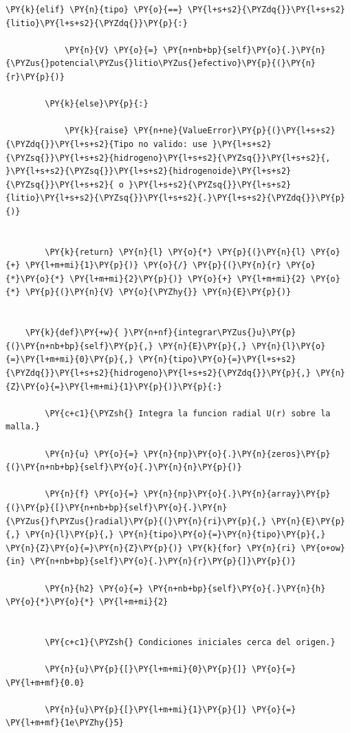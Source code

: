 \documentclass[11pt]{article}
\makeatletter
\def\PY@reset{\let\PY@it=\relax \let\PY@bf=\relax \let\PY@ul=\relax \let\PY@tc=\relax \let\PY@bc=\relax \let\PY@ff=\relax}
\def\PY@tok#1{\csname PY@tok@#1\endcsname}
\def\PY@toks#1+{\ifx\relax#1\empty\else \PY@tok{#1}\expandafter\PY@toks\fi}
\def\PY@do#1{\PY@bc{\PY@tc{\PY@ul{\PY@it{\PY@bf{\PY@ff{#1}}}}}}}
\def\PY#1#2{\PY@reset\PY@toks#1+\relax+\PY@do{#2}}
\makeatother
\begin{document}
\begin{tcolorbox}[breakable, size=fbox, boxrule=1pt, pad at break*=1mm,colback=cellbackground, colframe=cellborder]
\begin{Verbatim}[commandchars=\\\{\}]
        \PY{k}{elif} \PY{n}{tipo} \PY{o}{==} \PY{l+s+s2}{\PYZdq{}}\PY{l+s+s2}{litio}\PY{l+s+s2}{\PYZdq{}}\PY{p}{:}

            \PY{n}{V} \PY{o}{=} \PY{n+nb+bp}{self}\PY{o}{.}\PY{n}{\PYZus{}potencial\PYZus{}litio\PYZus{}efectivo}\PY{p}{(}\PY{n}{r}\PY{p}{)}

        \PY{k}{else}\PY{p}{:}

            \PY{k}{raise} \PY{n+ne}{ValueError}\PY{p}{(}\PY{l+s+s2}{\PYZdq{}}\PY{l+s+s2}{Tipo no valido: use }\PY{l+s+s2}{\PYZsq{}}\PY{l+s+s2}{hidrogeno}\PY{l+s+s2}{\PYZsq{}}\PY{l+s+s2}{, }\PY{l+s+s2}{\PYZsq{}}\PY{l+s+s2}{hidrogenoide}\PY{l+s+s2}{\PYZsq{}}\PY{l+s+s2}{ o }\PY{l+s+s2}{\PYZsq{}}\PY{l+s+s2}{litio}\PY{l+s+s2}{\PYZsq{}}\PY{l+s+s2}{.}\PY{l+s+s2}{\PYZdq{}}\PY{p}{)}


        \PY{k}{return} \PY{n}{l} \PY{o}{*} \PY{p}{(}\PY{n}{l} \PY{o}{+} \PY{l+m+mi}{1}\PY{p}{)} \PY{o}{/} \PY{p}{(}\PY{n}{r} \PY{o}{*}\PY{o}{*} \PY{l+m+mi}{2}\PY{p}{)} \PY{o}{+} \PY{l+m+mi}{2} \PY{o}{*} \PY{p}{(}\PY{n}{V} \PY{o}{\PYZhy{}} \PY{n}{E}\PY{p}{)}


    \PY{k}{def}\PY{+w}{ }\PY{n+nf}{integrar\PYZus{}u}\PY{p}{(}\PY{n+nb+bp}{self}\PY{p}{,} \PY{n}{E}\PY{p}{,} \PY{n}{l}\PY{o}{=}\PY{l+m+mi}{0}\PY{p}{,} \PY{n}{tipo}\PY{o}{=}\PY{l+s+s2}{\PYZdq{}}\PY{l+s+s2}{hidrogeno}\PY{l+s+s2}{\PYZdq{}}\PY{p}{,} \PY{n}{Z}\PY{o}{=}\PY{l+m+mi}{1}\PY{p}{)}\PY{p}{:}

        \PY{c+c1}{\PYZsh{} Integra la funcion radial U(r) sobre la malla.}

        \PY{n}{u} \PY{o}{=} \PY{n}{np}\PY{o}{.}\PY{n}{zeros}\PY{p}{(}\PY{n+nb+bp}{self}\PY{o}{.}\PY{n}{n}\PY{p}{)}

        \PY{n}{f} \PY{o}{=} \PY{n}{np}\PY{o}{.}\PY{n}{array}\PY{p}{(}\PY{p}{[}\PY{n+nb+bp}{self}\PY{o}{.}\PY{n}{\PYZus{}f\PYZus{}radial}\PY{p}{(}\PY{n}{ri}\PY{p}{,} \PY{n}{E}\PY{p}{,} \PY{n}{l}\PY{p}{,} \PY{n}{tipo}\PY{o}{=}\PY{n}{tipo}\PY{p}{,} \PY{n}{Z}\PY{o}{=}\PY{n}{Z}\PY{p}{)} \PY{k}{for} \PY{n}{ri} \PY{o+ow}{in} \PY{n+nb+bp}{self}\PY{o}{.}\PY{n}{r}\PY{p}{]}\PY{p}{)}

        \PY{n}{h2} \PY{o}{=} \PY{n+nb+bp}{self}\PY{o}{.}\PY{n}{h} \PY{o}{*}\PY{o}{*} \PY{l+m+mi}{2}


        \PY{c+c1}{\PYZsh{} Condiciones iniciales cerca del origen.}

        \PY{n}{u}\PY{p}{[}\PY{l+m+mi}{0}\PY{p}{]} \PY{o}{=} \PY{l+m+mf}{0.0}

        \PY{n}{u}\PY{p}{[}\PY{l+m+mi}{1}\PY{p}{]} \PY{o}{=} \PY{l+m+mf}{1e\PYZhy{}5}



\end{Verbatim}
\end{tcolorbox}
\end{document}
